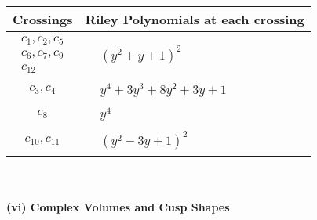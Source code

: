 \documentclass[1p]{elsarticle_modified}
\theoremstyle{definition}
\begin{document}
\begin{tabular}{m{50pt}|m{274pt}}
Crossings & \hspace{64pt}Riley Polynomials at each crossing \\
\hline $$\begin{aligned}c_{1},c_{2},c_{5}\\c_{6},c_{7},c_{9}\\c_{12}\end{aligned}$$&$\begin{aligned}
&(y^2+y+1)^2
\end{aligned}$\\
\hline $$\begin{aligned}c_{3},c_{4}\end{aligned}$$&$\begin{aligned}
&y^4+3 y^3+8 y^2+3 y+1
\end{aligned}$\\
\hline $$\begin{aligned}c_{8}\end{aligned}$$&$\begin{aligned}
&y^4
\end{aligned}$\\
\hline $$\begin{aligned}c_{10},c_{11}\end{aligned}$$&$\begin{aligned}
&(y^2-3 y+1)^2
\end{aligned}$\\
\hline
\end{tabular}\\~\\
\newpage\flushleft \textbf{(vi) Complex Volumes and Cusp Shapes}
\end{document}
